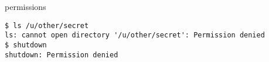 \begin{frame}[fragile]{permissions}
\begin{Verbatim}[fontsize=\fontsize{11}{12}]
$ ls /u/other/secret
ls: cannot open directory '/u/other/secret': Permission denied
$ shutdown
shutdown: Permission denied
\end{Verbatim}
\end{frame}
